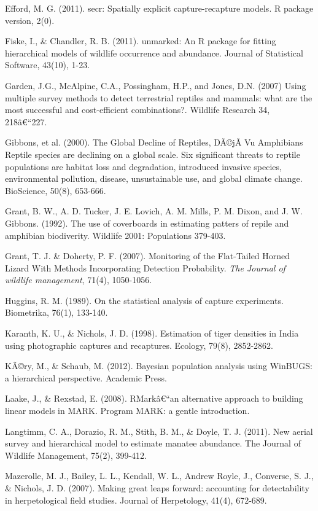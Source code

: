 \documentclass{book}
\begin{document}
\rf Efford, M. G. (2011). secr: Spatially explicit capture-recapture models. R package version, 2(0).

\rf Fiske, I., \& Chandler, R. B. (2011). unmarked: An R package for fitting hierarchical models of wildlife occurrence and abundance. Journal of Statistical Software, 43(10), 1-23.

\rf Garden, J.G., McAlpine, C.A., Possingham, H.P., and Jones, D.N. (2007) Using multiple survey methods to detect terrestrial reptiles and mammals: what are the most successful and cost-efficient combinations?. Wildlife Research 34, 218â€“227.

\rf Gibbons, et al. (2000). The Global Decline of Reptiles, DÃ©jÃ  Vu Amphibians Reptile species are declining on a global scale. Six significant threats to reptile populations are habitat loss and degradation, introduced invasive species, environmental pollution, disease, unsustainable use, and global climate change. BioScience, 50(8), 653-666.

\rf Grant, B. W., A. D. Tucker, J. E. Lovich, A. M. Mills, P. M. Dixon, and J. W. Gibbons. (1992). The use of coverboards in estimating patters of repile and amphibian biodiverity. Wildlife 2001: Populations 379-403.

Grant, T. J. \& Doherty, P. F. (2007). Monitoring of the Flat-Tailed Horned Lizard With Methods Incorporating Detection Probability. \textit{The Journal of wildlife management}, 71(4), 1050-1056.

\rf Huggins, R. M. (1989). On the statistical analysis of capture experiments. Biometrika, 76(1), 133-140.

\rf  Karanth, K. U., \& Nichols, J. D. (1998). Estimation of tiger densities in India using photographic captures and recaptures. Ecology, 79(8), 2852-2862.

\rf KÃ©ry, M., \& Schaub, M. (2012). Bayesian population analysis using WinBUGS: a hierarchical perspective. Academic Press.

\rf Laake, J., \& Rexstad, E. (2008). RMarkâ€“an alternative approach to building linear models in MARK. Program MARK: a gentle introduction.

\rf Langtimm, C. A., Dorazio, R. M., Stith, B. M., \& Doyle, T. J. (2011). New aerial survey and hierarchical model to estimate manatee abundance. The Journal of Wildlife Management, 75(2), 399-412.

\rf Mazerolle, M. J., Bailey, L. L., Kendall, W. L., Andrew Royle, J., Converse, S. J., \& Nichols, J. D. (2007). Making great leaps forward: accounting for detectability in herpetological field studies. Journal of Herpetology, 41(4), 672-689.
\end{document}
